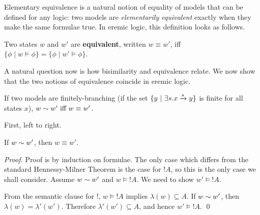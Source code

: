 Elementary equivalence is a natural notion of equality of models that
can be defined for any logic: two models are \emph{elementarily
  equivalent} exactly when they make the same formulae true. In eremic
logic, this definition looks as follows.

\begin{definition}
Two states $w$ and $w'$ are {\bf equivalent}, written $w \equiv w'$,
iff $\{\phi \; | \; w \models \phi\} = \{\phi \; | \; w' \models
\phi\}$.
\end{definition}

\NI A natural question now is how bisimilarity and equivalence
relate. We now show that the two notions of equivalence coincide in
eremic logic.

\begin{theorem}
If two models are finitely-branching (if the set $\{y \ | \  \exists s
. x \xrightarrow{s} y\}$ is finite for all states $x$), $w \sim w'
\mbox{ iff } w \equiv w' $.
\end{theorem}
First, left to right.
\begin{case}
If $w \sim w'$, then $w \equiv w'$.
\end{case}
\begin{proof}
Proof is by induction on formulae.  The only case which differs from
the standard Hennessy-Milner Theorem is the case for $!A$, so this is
the only case we shall consider.  Assume $w \sim w'$ and $w \models
!A$. We need to show $w' \models !A$.

From the semantic clause for $!$,  $w \models !A$ implies $\lambda(w) \subseteq A$.
If $w \sim w'$, then $\lambda(w) = \lambda'(w')$.
Therefore $\lambda'(w') \subseteq A$, and hence $w' \models !A$.
\qed
\end{proof}

